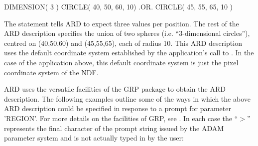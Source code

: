 \documentclass[11pt,nolof]{starlink}
\begin{document}
\small
\begin{terminalv}
      DIMENSION( 3 )
      CIRCLE( 40, 50, 60, 10) .OR. CIRCLE( 45, 55, 65, 10 )
\end{terminalv}
\normalsize

The  statement tells ARD to expect three values per position. The rest
of the ARD description specifies the union of two spheres (i.e. ``3-dimensional
circles''), centred on (40,50,60) and (45,55,65), each of radius 10. This ARD
description uses the default coordinate system established by the application's
call to . In the case of the application above, this default
coordinate system is just the pixel coordinate system of the NDF.

ARD uses the versatile facilities of the GRP package to obtain the ARD
description. The following examples outline some of the ways in which the above
ARD description could be specified in response to a prompt for parameter
'REGION'. For more details on the facilities of GRP, see . In each case
the ``$>$'' represents the final character of the prompt string issued by the
ADAM parameter system and is not actually typed in by the user:
\end{document}
